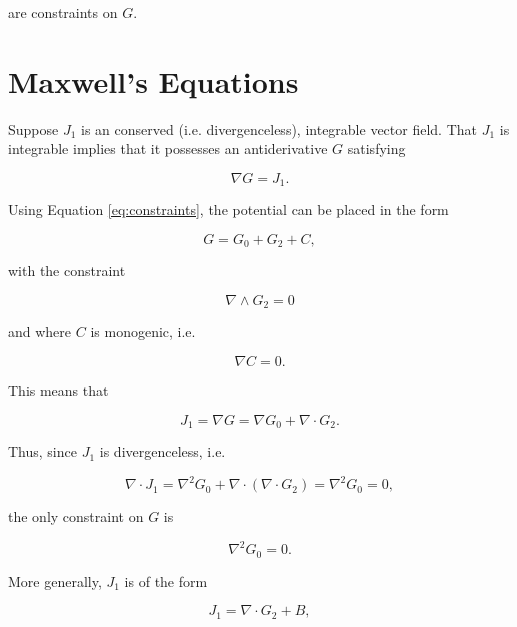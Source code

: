 \documentclass{article}
\begin{document}
are constraints on $G$.

\section{Maxwell's Equations}

Suppose $J_1$ is an conserved (i.e. divergenceless), integrable vector field. That $J_1$ is integrable implies that it possesses an antiderivative $G$ satisfying

  \begin{equation}
    \nabla G = J_1.
  \end{equation}

  Using Equation \ref{eq:constraints}, the potential can be placed in the form

  \begin{equation}
    G = G_0 + G_2 + C,
  \end{equation}

  with the constraint

  \begin{equation}
    \nabla \wedge G_2 = 0\label{eq:curl-free}
  \end{equation}

  and where $C$ is monogenic, i.e.

  \begin{equation}
    \nabla C = 0.\label{eq:monogenic}
  \end{equation}

  This means that

  \begin{equation}
    J_1 = \nabla G = \nabla G_0 + \nabla \cdot G_2.\label{eq:current-conclusion-1}
  \end{equation}

  Thus, since $J_1$ is divergenceless, i.e.

  \begin{equation}
    \nabla \cdot J_1 = \nabla^2 G_0 + \nabla \cdot (\nabla \cdot G_2) = \nabla^2 G_0 = 0,
  \end{equation} 

  the only constraint on $G$ is

  \begin{equation}
    \nabla^2 G_0 = 0.\label{eq:harmonic}
  \end{equation}

  More generally, $J_1$ is of the form

  \begin{equation}
    J_1 = \nabla \cdot G_2 + B,
  \end{equation}
\end{document}
